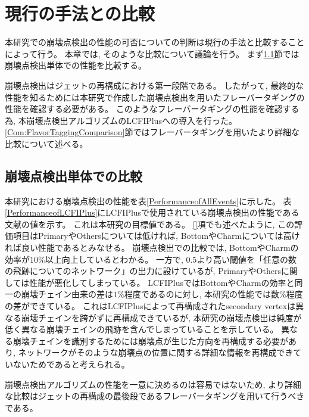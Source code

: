 
\chapter{現行の手法との比較} \label{chap:Comparison}

本研究での崩壊点検出の性能の可否についての判断は現行の手法と比較することによって行う。
本章では, そのような比較について議論を行う。
まず\ref{Com:ComparisonwithVF}節では崩壊点検出単体での性能を比較する。

崩壊点検出はジェットの再構成における第一段階である。
したがって, 最終的な性能を知るためには本研究で作成した崩壊点検出を用いたフレーバータギングの性能を確認する必要がある。
このようなフレーバータギングの性能を確認する為, 本崩壊点検出アルゴリズムのLCFIPlusへの導入を行った。
\ref{Com:FlavorTaggingComparison}節ではフレーバータギングを用いたより詳細な比較について述べる。


\section{崩壊点検出単体での比較} \label{Com:ComparisonwithVF}

本研究における崩壊点検出の性能を表\ref{PerformanceofAllEvents}に示した。
表\ref{PerformanceofLCFIPlus}にLCFIPlusで使用されている崩壊点検出の性能である文献\cite{LCFIPlusPaper}の値を示す。
これは本研究の目標値である。
\ref{}項でも述べたように, この評価項目はPrimaryやOthersについては低ければ, BottomやCharmについては高ければ良い性能であるとみなせる。
崩壊点検出での比較では, BottomやCharmの効率が$10\%$以上向上しているとわかる。
一方で, $0.5$より高い閾値を「任意の数の飛跡についてのネットワーク」の出力に設けているが, PrimaryやOthersに関しては性能が悪化してしまっている。
LCFIPlusではBottomやCharmの効率と同一の崩壊チェイン由来の差は$1\%$程度であるのに対し, 本研究の性能では数\%程度の差ができている。
これはLCFIPlusによって再構成されたsecondary vertexは異なる崩壊チェインを跨がずに再構成できているが, 本研究の崩壊点検出は純度が低く異なる崩壊チェインの飛跡を含んでしまっていることを示している。
異なる崩壊チェインを識別するためには崩壊点が生じた方向を再構成する必要があり, ネットワークがそのような崩壊点の位置に関する詳細な情報を再構成できていないためであると考えられる。

崩壊点検出アルゴリズムの性能を一意に決めるのは容易ではないため, より詳細な比較はジェットの再構成の最後段であるフレーバータギングを用いて行うべきである。

